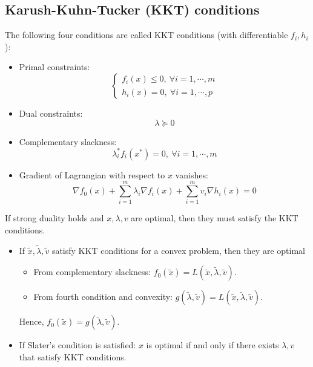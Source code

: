 \subsection{Karush-Kuhn-Tucker (KKT) conditions}
The following four conditions are called KKT conditions (with differentiable $f_i, h_i$):
\begin{itemize}
    \item Primal constraints:
    $$
    \begin{cases}
        f_i(x) \le 0, \ \forall i = 1, \cdots, m  \\
        h_i(x) = 0, \ \forall i = 1, \cdots, p  
    \end{cases}
    $$
    \item Dual constraints:
    $$
    \lambda \succcurlyeq 0
    $$
    \item Complementary slackness: 
    $$
    \lambda^*_if_i(x^*) = 0, \ \forall i = 1, \cdots, m
    $$
    \item Gradient of Lagrangian with respect to $x$ vanishes:
    $$
    \nabla f_0(x) + \sum_{i = 1}^m \lambda_i \nabla f_i(x) + \sum_{i = 1}^m v_i\nabla h_i(x) = 0
    $$
\end{itemize}
If strong duality holds and $x, \lambda, v$ are optimal, then they must satisfy the KKT conditions.
\begin{itemize}
    \item If $\tilde{x}, \tilde{\lambda}, \tilde{v}$ satisfy KKT conditions for a convex problem, then they are optimal
    \begin{itemize}
        \item From complementary slackness: $f_0(\tilde{x}) = L(\tilde{x}, \tilde{\lambda}, \tilde{v})$.
        \item From fourth condition and convexity: $g(\tilde{\lambda}, \tilde{v}) = L(\tilde{x}, \tilde{\lambda}, \tilde{v})$.
    \end{itemize}
    Hence, $f_0(\tilde{x}) = g(\tilde{\lambda}, \tilde{v})$.
    \item If Slater's condition is satisfied: $x$ is optimal if and only if there exists $\lambda, v$ that satisfy KKT conditions.
\end{itemize}




\pagebreak